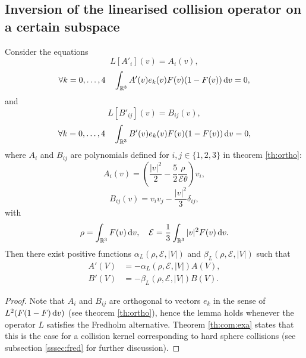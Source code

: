 \begin{subappendices}
\renewcommand{\thesection}{\Alph{section}}
% 
\section[Inversion of the linearised collision operator%
][Inversion of the linearised collision operator]{Inversion of the linearised collision operator on a certain subspace} %
\label{sec:invariants}

\begin{lemma}\label{le:invert}
	Consider the equations
	 \begin{equation}\label{eq:app:A}
	 	L[A'_i](v)=A_i(v),
	 \end{equation}
	 \begin{equation}\label{eq:app:Aort}
 \forall k=0,\ldots,4\quad\int_{{\mathbb {R}^3}} A' (v)e_k(v) F(v)(1-F(v)) {\,\mathrm{d} v}=0,   	
	 \end{equation}
	 and
	 \begin{equation}\label{eq:app:B}
	 	L[B'_{ij}](v)=B_{ij}(v),
	 \end{equation}	 
	 \begin{equation}\label{eq:app:Bort}
 \forall k=0,\ldots,4\quad\int_{{\mathbb {R}^3}} B' (v)e_k(v) F(v)(1-F(v)) {\,\mathrm{d} v}=0,   	
	 \end{equation}
where $A_i$ and $B_{ij}$ are polynomials defined for $i,j\in\{1,2,3\}$ in theorem \ref{th:ortho}: 
\[A_i(v)=\left(\frac{|v|^2}{2}-\frac{5}{2}\frac{\rho}{\mathcal E\theta}\right)v_i,\]
\[B_{ij}(v)=v_iv_j-\frac{|v|^2}{3}\delta_{ij},\]
with
\[\rho=\int_{{\mathbb {R}^3}}F(v){\,\mathrm{d} v},\quad \mathcal E=\frac 13\int_{{\mathbb {R}^3}} {|v|^2} F(v){\,\mathrm{d} v}.\]
Then there exist positive functions $\alpha_L(\rho,\mathcal E,|V|)$ and $\beta_L(\rho,\mathcal E,|V|)$ such that\begin{align}
		A'(V)&= -\alpha_L(\rho,\mathcal E,|V|)A(V),\label{eq:A:prime}\\
		 B'(V)&= -\beta_L(\rho,\mathcal E,|V|)B(V).\label{eq:B:prime}
	\end{align}
	\end{lemma}
\begin{proof}
Note that $A_i$ and $B_{ij}$ are orthogonal to vectors $e_k$ in the sense of $L^2(F(1-F){\,\mathrm{d} v})$ (see theorem \ref{th:ortho}), hence the lemma holds whenever the operator $L$ satisfies the Fredholm alternative. Theorem \ref{th:com:exa} states that this is the case for a collision kernel corresponding to  hard sphere collisions (see subsection \ref{sssec:fred} for further discussion).


\end{proof}
\end{subappendices}
